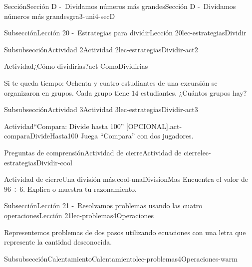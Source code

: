 \documentclass[twoside,10pt,]{article}
\begin{document}
\begin{sectionptx}{Sección}{Sección D -~Dividamos números más grandes}{}{Sección D -~Dividamos números más grandes}{}{}{gra3-uni4-secD}
\begin{subsectionptx}{Subsección}{Lección 20 -~Estrategias para dividir}{}{Lección 20}{}{}{lec-estrategiasDividir}
\begin{subsubsectionptx}{Subsubsección}{Actividad 2}{}{Actividad 2}{}{}{lec-estrategiasDividir-act2}
\begin{activity}{Actividad}{¿Cómo dividirías?}{act-ComoDividirias}
\begin{enumerate}
\end{enumerate}
Si te queda tiempo: Ochenta y cuatro estudiantes de una excursión se organizaron en grupos. Cada grupo tiene \(14\) estudiantes. ¿Cuántos grupos hay?%
\end{activity}%
\end{subsubsectionptx}
%
%
\typeout{************************************************}
\typeout{************************************************}
%
\begin{subsubsectionptx}{Subsubsección}{Actividad 3}{}{Actividad 3}{}{}{lec-estrategiasDividir-act3}
\begin{activity}{Actividad}{“Compara: Divide hasta 100” [OPCIONAL].}{act-comparaDivideHasta100}%
Juega ``Compara'' con dos jugadores.%
\end{activity}%
\end{subsubsectionptx}
%
%
\typeout{************************************************}
\typeout{************************************************}
%
\begin{reading-questions-subsubsection}{Preguntas de comprensión}{Actividad de cierre}{}{Actividad de cierre}{}{}{lec-estrategiasDividir-cool}
\begin{project}{Actividad de cierre}{Una división más.}{cool-unaDivisionMas}%
Encuentra el valor de \(96 \div 6\). Explica o muestra tu razonamiento.%
\end{project}%
\end{reading-questions-subsubsection}
\end{subsectionptx}
%
%
\typeout{************************************************}
\typeout{************************************************}
%
\begin{subsectionptx}{Subsección}{Lección 21 -~Resolvamos problemas usando las cuatro operaciones}{}{Lección 21}{}{}{lec-problemas4Operaciones}
\begin{introduction}{}%
Representemos problemas de dos pasos utilizando ecuaciones con una letra que represente la cantidad desconocida.%
\end{introduction}%
%
%
\typeout{************************************************}
\typeout{************************************************}
%
\begin{subsubsectionptx}{Subsubsección}{Calentamiento}{}{Calentamiento}{}{}{lec-problemas4Operaciones-warm}

\end{subsubsectionptx}
\end{subsectionptx}
\end{sectionptx}
\end{document}
